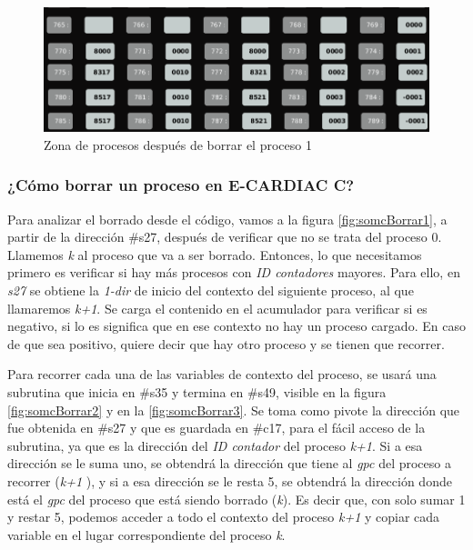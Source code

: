\documentclass[letterpaper,12pt,oneside]{book}
\begin{document}
		\begin{figure}[h]		
			\centering
			\includegraphics[scale=0.45]{media/CARDIACC/ZPAfterProceso1Borrado.png}
			\caption{ Zona de procesos después de borrar el proceso 1}
			\label{fig:ZPAfterProceso1Borrado}
		\end{figure}
		
		
		\subsubsection{¿Cómo borrar un proceso en E-CARDIAC C?}
		
		
		Para analizar el borrado desde el código,  vamos a la figura \ref{fig:somcBorrar1}, a partir de la dirección \#s27, después
		de verificar que no se trata del proceso 0. Llamemos \textit{k} al proceso que va a ser borrado. Entonces, lo que necesitamos
		primero
		es verificar si hay más procesos con \textit{ID contadores} mayores. Para ello, en \textit{s27}
		se obtiene la \textit{1-dir} de inicio del contexto del siguiente proceso, al que llamaremos \textit{k+1}.
		Se carga el contenido en el acumulador para
		verificar si es negativo, si lo es significa que en ese contexto no hay un proceso cargado.
		En caso de que sea positivo, quiere decir que hay otro proceso y se tienen que recorrer.
		
		Para recorrer cada una
		de las variables de contexto del proceso, se usará una subrutina que 
		inicia en \#s35 y termina en \#s49, visible en la figura \ref{fig:somcBorrar2} y en la \ref{fig:somcBorrar3}. 
		Se toma como pivote la dirección que 
		fue obtenida en \#s27 y que es guardada en
		\#c17, para el fácil acceso de la subrutina, ya que es la dirección
		del \textit{ID contador} del proceso \textit{k+1}. Si a esa dirección se le suma uno, se obtendrá la dirección que tiene al \textit{gpc}
		del proceso a recorrer (\textit{k+1 }), y si a esa dirección se le resta 5, 
		se obtendrá la dirección donde está  el \textit{gpc} del proceso que está siendo 
		borrado (\textit{k}). Es decir que, con solo sumar 1 y restar 5, podemos acceder a todo el contexto del proceso \textit{k+1} y copiar
		cada variable en el lugar correspondiente del proceso \textit{k}.
		
\end{document}
